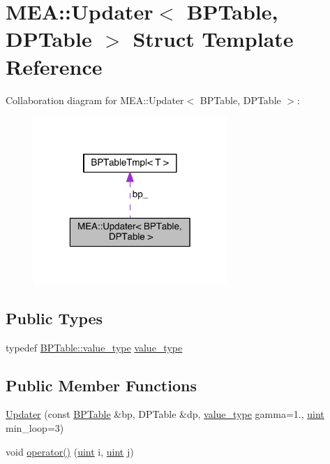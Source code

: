 \hypertarget{struct_m_e_a_1_1_updater}{\section{M\+E\+A\+:\+:Updater$<$ B\+P\+Table, D\+P\+Table $>$ Struct Template Reference}
\label{struct_m_e_a_1_1_updater}
}


Collaboration diagram for M\+E\+A\+:\+:Updater$<$ B\+P\+Table, D\+P\+Table $>$\+:
\nopagebreak
\begin{figure}[H]
\begin{center}
\leavevmode
\includegraphics[width=208pt]{struct_m_e_a_1_1_updater__coll__graph}
\end{center}
\end{figure}
\subsection*{Public Types}
\begin{DoxyCompactItemize}
\item 
typedef \hyperlink{class_b_p_table_tmpl_abeaa8313585c7a571fae9d26211432a6}{B\+P\+Table\+::value\+\_\+type} \hyperlink{struct_m_e_a_1_1_updater_a34ff27ad742334ae0d3f317810362f2a}{value\+\_\+type}
\end{DoxyCompactItemize}
\subsection*{Public Member Functions}
\begin{DoxyCompactItemize}
\item 
\hyperlink{struct_m_e_a_1_1_updater_afbcad7135cff199616703c5140caa8ec}{Updater} (const \hyperlink{folding__engine_8h_a065821fb17bbd8df315f2435c973e3c1}{B\+P\+Table} \&bp, D\+P\+Table \&dp, \hyperlink{struct_m_e_a_1_1_updater_a34ff27ad742334ae0d3f317810362f2a}{value\+\_\+type} gamma=1., \hyperlink{cyktable_8h_a91ad9478d81a7aaf2593e8d9c3d06a14}{uint} min\+\_\+loop=3)
\item 
void \hyperlink{struct_m_e_a_1_1_updater_a3a76608a3a9cc8d9d7babeae9bb1670d}{operator()} (\hyperlink{cyktable_8h_a91ad9478d81a7aaf2593e8d9c3d06a14}{uint} i, \hyperlink{cyktable_8h_a91ad9478d81a7aaf2593e8d9c3d06a14}{uint} j)
\end{DoxyCompactItemize}
